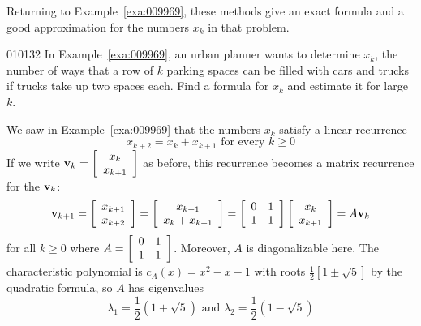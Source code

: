 \noindent Returning to Example~\ref{exa:009969}, these methods give an exact formula and a good approximation for the numbers $x_{k}$ in that problem.


\begin{example}{}{010132}
In Example~\ref{exa:009969}, an urban planner wants to determine $x_{k}$, the number of ways that a row of $k$ parking spaces can be filled with cars and trucks if trucks take up two spaces each. Find a formula for $x_{k}$ and estimate it for large $k$.


\begin{solution}
  We saw in Example~\ref{exa:009969} that the numbers $x_{k}$ satisfy a linear recurrence
\begin{equation*}
x_{k+2} = x_k + x_{k+1} \mbox{ for every } k \geq 0
\end{equation*}
If we write $\textbf{v}_k = \left[ \begin{array}{c}
x_k \\
x_{k+1}
\end{array}\right]$ 
as before, this recurrence becomes a matrix recurrence for the $\textbf{v}_{k}$:
\begin{equation*}
\textbf{v}_{k+1} = \left[ \begin{array}{c}
x_{k+1} \\
x_{k+2} 
\end{array}\right] = \left[ \begin{array}{c}
x_{k+1} \\
x_k + x_{k+1}
\end{array}\right] = \left[ \begin{array}{rr}
0 & 1 \\
1 & 1 
\end{array}\right] \left[ \begin{array}{c}
x_k \\
x_{k+1}
\end{array}\right] = A \textbf{v}_k
\end{equation*}
for all $k \geq 0$ where $A = \left[ \begin{array}{cc}
0 & 1 \\
1 & 1 
\end{array}\right]$. 
 Moreover, $A$ is diagonalizable here. The characteristic polynomial is $c_{A}(x) = x^{2} - x - 1$ with roots $\frac{1}{2} \left[ 1 \pm \sqrt{5} \right]$
 by the quadratic formula, so $A$ has eigenvalues 
\begin{equation*}
\lambda_1 = \frac{1}{2} \left( 1 + \sqrt{5} \right) \mbox{ and }\lambda_2 = \frac{1}{2} \left( 1 - \sqrt{5} \right)

\end{equation*}
\end{solution}
\end{example}
